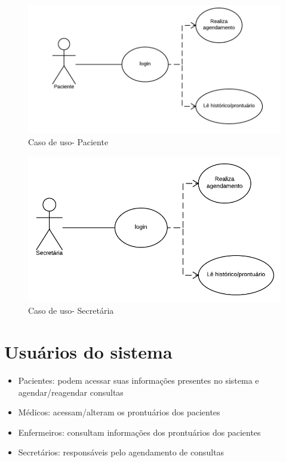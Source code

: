 \documentclass[11pt,a4paper]{report}
\begin{document}
\begin{figure}[ht!]
  \caption{Caso de uso- Paciente}
  \centering
  \includegraphics[scale=.4]{patient.png}
\end{figure}

\begin{figure}[ht!]
  \caption{Caso de uso- Secretária}
  \centering
  \includegraphics[scale=.4]{secretary.png}
\end{figure}


\newpage

\section{Usuários do sistema}

\begin{itemize}
\item Pacientes: podem acessar suas informações presentes no sistema e agendar/reagendar consultas
\item Médicos: acessam/alteram os prontuários dos pacientes
\item Enfermeiros: consultam informações dos prontuários dos pacientes
\item Secretários: responsáveis pelo agendamento de consultas

\end{itemize}
\end{document}
